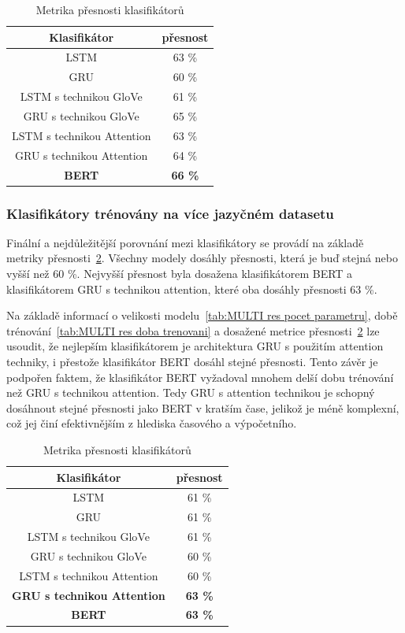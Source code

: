 \begin{table}[H]
	\centering
	\caption{Metrika přesnosti klasifikátorů}\label{tab:res metrika presnosti}
	\begin{tabular}{ c c }
			\toprule
			Klasifikátor & přesnost\\
			\midrule
			LSTM & 63 \%\\
			GRU & 60 \%\\         
			LSTM s technikou GloVe & 61 \%\\         
			GRU s technikou GloVe & 65 \%\\         
			LSTM s technikou Attention & 63 \%\\         
			GRU s technikou Attention & 64 \%\\         
			\textbf{BERT} & \textbf{66 \%} \\         
			\midrule
		\end{tabular}
\end{table}

\subsubsection{Klasifikátory trénovány na více jazyčném datasetu}
Finální a nejdůležitější porovnání mezi klasifikátory se provádí na základě metriky přesnosti~\ref{tab:MULTI res metrika presnosti}.
Všechny modely dosáhly přesnosti, která je buď stejná nebo vyšší než 60 \%.
Nejvyšší přesnost byla dosažena klasifikátorem BERT a klasifikátorem GRU s technikou attention, které oba dosáhly přesnosti 63 \%.

Na základě informací o velikosti modelu~\ref{tab:MULTI res pocet parametru}, době trénování~\ref{tab:MULTI res doba trenovani} a dosažené metrice přesnosti~\ref{tab:MULTI res metrika presnosti} lze usoudit, že nejlepším klasifikátorem je architektura GRU s použitím attention techniky, i přestože klasifikátor BERT dosáhl stejné přesnosti.
Tento závěr je podpořen faktem, že klasifikátor BERT vyžadoval mnohem delší dobu trénování než GRU s technikou attention.
Tedy GRU s attention technikou je schopný dosáhnout stejné přesnosti jako BERT v kratším čase, jelikož je méně komplexní, což jej činí efektivnějším z hlediska časového a výpočetního.
\begin{table}[H]
	\centering
	\caption{Metrika přesnosti klasifikátorů}\label{tab:MULTI res metrika presnosti}
	\begin{tabular}{ c c }
			\toprule
			Klasifikátor & přesnost\\
			\midrule
			LSTM & 61 \%\\
			GRU & 61 \%\\         
			LSTM s technikou GloVe & 61 \%\\         
			GRU s technikou GloVe & 60 \%\\         
			LSTM s technikou Attention & 60 \%\\         
			\textbf{GRU s technikou Attention} & \textbf{63 \%}\\         
			\textbf{BERT} & \textbf{63 \%} \\         
			\midrule
		\end{tabular}
\end{table}

